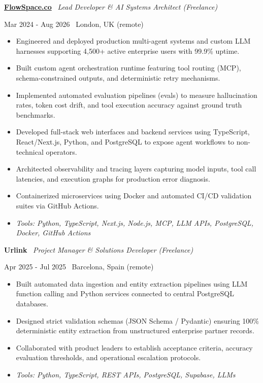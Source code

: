 \documentclass[a4paper,10pt]{article}
\newcommand{\role}[4]{%
  \vspace{2pt}\noindent
  \begin{minipage}[t]{0.70\textwidth}\raggedright\textbf{#1} \textbullet\ \textit{#3}\end{minipage}%
  \hfill
  \begin{minipage}[t]{0.28\textwidth}\raggedleft\footnotesize\color{gray}#2 \textbullet\ #4\end{minipage}%
  \vspace{1pt}%
}
\begin{document}
\role{\href{https://flowspace.co}{FlowSpace.co}}{Mar 2024 - Aug 2026}{Lead Developer \& AI Systems Architect (Freelance)}{London, UK (remote)}
\begin{itemize}
  \item Engineered and deployed production multi-agent systems and custom LLM harnesses supporting 4,500+ active enterprise users with 99.9\% uptime.
  \item Built custom agent orchestration runtime featuring tool routing (MCP), schema-constrained outputs, and deterministic retry mechanisms.
  \item Implemented automated evaluation pipelines (evals) to measure hallucination rates, token cost drift, and tool execution accuracy against ground truth benchmarks.
  \item Developed full-stack web interfaces and backend services using TypeScript, React/Next.js, Python, and PostgreSQL to expose agent workflows to non-technical operators.
  \item Architected observability and tracing layers capturing model inputs, tool call latencies, and execution graphs for production error diagnosis.
  \item Containerized microservices using Docker and automated CI/CD validation suites via GitHub Actions.
  \item \textit{Tools: Python, TypeScript, Next.js, Node.js, MCP, LLM APIs, PostgreSQL, Docker, GitHub Actions}
\end{itemize}

\role{Urlink}{Apr 2025 - Jul 2025}{Project Manager \& Solutions Developer (Freelance)}{Barcelona, Spain (remote)}
\begin{itemize}
  \item Built automated data ingestion and entity extraction pipelines using LLM function calling and Python services connected to central PostgreSQL databases.
  \item Designed strict validation schemas (JSON Schema / Pydantic) ensuring 100\% deterministic entity extraction from unstructured enterprise partner records.
  \item Collaborated with product leaders to establish acceptance criteria, accuracy evaluation thresholds, and operational escalation protocols.
  \item \textit{Tools: Python, TypeScript, REST APIs, PostgreSQL, Supabase, LLMs}
\end{itemize}
\end{document}
